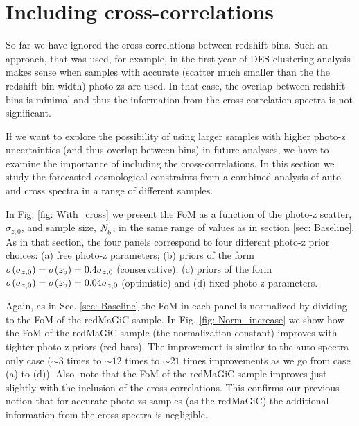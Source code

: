 \documentclass[a4paper,fleqn,usenatbib]{mnras}
\begin{document}
\section{Including cross-correlations}
\label{sec: Cross_correlations}

So far we have ignored the cross-correlations between redshift bins. Such an approach, that was used, for example, in the first year of DES clustering analysis makes sense when samples with accurate (scatter much smaller than the the redshift bin width) photo-zs are used. In that case, the overlap between redshift bins is minimal and thus the information from the cross-correlation spectra is not significant.

If we want to explore the possibility of using larger samples with higher photo-z uncertainties (and thus overlap between bins) in future analyses, we have to examine the importance of including the cross-correlations. In this section we study the forecasted cosmological constraints from a combined analysis of auto and cross spectra in a range of different samples.

\begin{figure*}
\centering

\caption{Similar to Fig. \ref{fig: Baseline}, but now including the cross-correlations between bins when forecasting the cosmological constraints from different samples.}
\label{fig: With_cross}
\end{figure*}


In Fig. \ref{fig: With_cross} we present the FoM as a function of the photo-z scatter, $\sigma_{z,0}$,  and sample size, $N_{\mbox{\scriptsize{g}}}$, in the same range of values as in section \ref{sec: Baseline}. As in that section, the four panels  correspond to four different photo-z prior choices: (a) free photo-z parameters; (b) priors of the form $\sigma(\sigma_{z,0}) = \sigma(z_{\mbox{\scriptsize{b}}}) = 0.4  \sigma_{z,0}$ (conservative); (c) priors of the form $\sigma(\sigma_{z,0}) = \sigma(z_{\mbox{\scriptsize{b}}}) = 0.04  \sigma_{z,0}$ (optimistic)  and (d) fixed photo-z parameters.

Again, as in Sec. \ref{sec: Baseline} the FoM in each panel is normalized by dividing to the FoM of the redMaGiC sample. In Fig. \ref{fig: Norm_increase}  we show how the FoM of the redMaGiC sample (the normalization constant) improves with tighter photo-z priors (red bars). The improvement is similar to the auto-spectra only case ($\sim 3$ times to $\sim 12$ times to $\sim 21$ times improvements as we go from case (a) to (d)). Also, note that the FoM of the redMaGiC sample improves just slightly with the inclusion of the cross-correlations. This confirms our previous notion that for accurate photo-zs samples (as the redMaGiC) the additional information from the cross-spectra is negligible.
\end{document}

